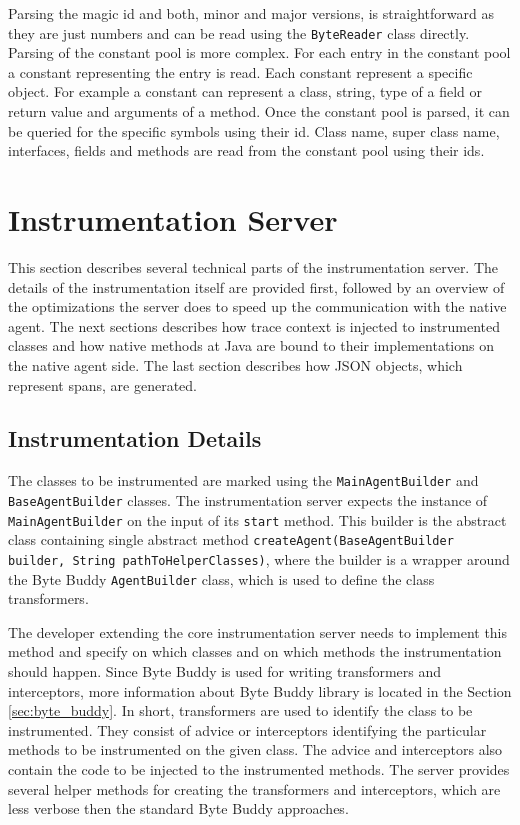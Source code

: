 Parsing the magic id and both, minor and major versions, is straightforward as they are just numbers and can be read using the \texttt{ByteReader} class directly. Parsing of the constant pool is more complex. For each entry in the constant pool a constant representing the entry is read. Each constant represent a specific object. For example a constant can represent a class, string, type of a field or return value and arguments of a method. Once the constant pool is parsed, it can be queried for the specific symbols using their id. Class name, super class name, interfaces, fields and methods are read from the constant pool using their ids.

\section{Instrumentation Server}
This section describes several technical parts of the instrumentation server. The details of the instrumentation itself are provided first, followed by an overview of the optimizations the server does to speed up the communication with the native agent. The next sections describes how trace context is injected to instrumented classes and how native methods at Java are bound to their implementations on the native agent side. The last section describes how JSON objects, which represent spans, are generated.

\subsection{Instrumentation Details}
\label{impl:server:instr}
The classes to be instrumented are marked using the \texttt{MainAgentBuilder} and \texttt{BaseAgentBuilder} classes.
The instrumentation server expects the instance of \texttt{MainAgentBuilder} on the input of its \texttt{start} method. This builder is the abstract class containing single abstract method \texttt{createAgent(BaseAgentBuilder builder, String pathToHelperClasses)}, where the builder is a wrapper \linebreak around the Byte Buddy \texttt{AgentBuilder} class, which is used to define the class transformers.

The developer extending the core instrumentation server needs to implement this method and specify on which classes and on which methods the instrumentation should happen. Since Byte Buddy is used for writing transformers and interceptors, more information about Byte Buddy library is located in the Section \ref{sec:byte_buddy}. In short, transformers are used to identify the class to be instrumented. They consist of advice or interceptors identifying the particular methods to be instrumented on the given class. The advice and interceptors also contain the code to be injected to the instrumented methods. The server provides several helper methods for creating the transformers and interceptors, which are less verbose then the standard Byte Buddy approaches.

